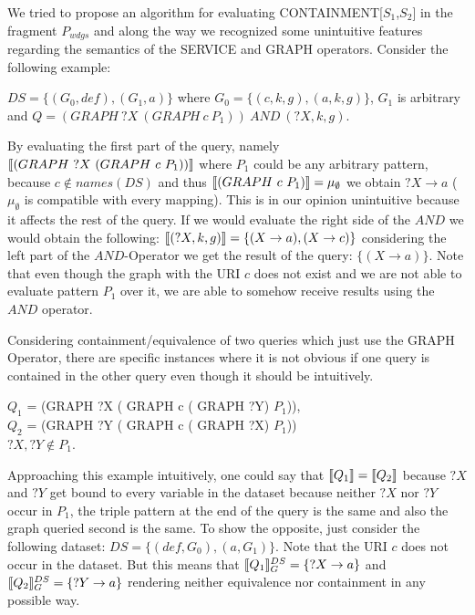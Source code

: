 			We tried to propose an algorithm for evaluating CONTAINMENT[$S_1$,$S_2$] in the
			fragment $P_{wdgs}$ and
			along the way we recognized some unintuitive features regarding the semantics of the
			SERVICE and GRAPH operators. Consider the following example:

			\begin{example}
				$DS=\{(G_0,def), (G_1,a) \}$ where $G_0 = \{
				(c,k,g), (a,k,g) \}$, $G_1$ is arbitrary and  $Q = (GRAPH \ ?X  \ (GRAPH  \ c \  P_1)) \ AND \ (?X,k,g)$.
			\end{example}

			By evaluating the first part of the query, namely $\llbracket (GRAPH \ ?X  \ (GRAPH  \
			c \  P_1)) \rrbracket$ where $P_1$ could be any arbitrary pattern, because $c \notin
			names(DS)$ and thus $\llbracket (GRAPH \ c  \ P_1) \rrbracket = \mu_\emptyset$  we obtain $?X
			\rightarrow a$ ($\mu_\emptyset$ is compatible with every mapping). This is in
			our opinion unintuitive because it affects the rest of the query.
			If we would evaluate the right side of the $AND$ we would obtain the following: $\llbracket(?X,k,g)\rrbracket = \{ (X \rightarrow a) , (X \rightarrow c) \}$ considering the
			left part of the $AND$-Operator we get the result of the query: $\{ (X \rightarrow a )
			\}$. Note that even though the graph with the URI $c$ does not exist and we are not able
			to evaluate pattern $P_1$ over it, we are able to somehow receive results using
			the $AND$ operator.
			\bigskip

			\noindent Considering containment/equivalence of two queries which just use the GRAPH
			Operator, there are specific instances where it is not obvious if one query is contained in the other query even though it should be intuitively.

			\begin{example}
				$Q_1$ = (GRAPH ?X ( GRAPH c ( GRAPH ?Y) $P_1$)),\\ 
				$Q_2$ = (GRAPH ?Y ( GRAPH c ( GRAPH ?X) $ P_1$))\\
				$?X,?Y \notin P_1$.
			\end{example}

			Approaching this example intuitively, one could say that $\llbracket Q_1 \rrbracket = \llbracket Q_2
			\rrbracket$ because $?X$ and $?Y$ get bound to every variable in the dataset because neither
			$?X$ nor $?Y$ occur in $P_1$, the triple pattern at the end
			of the query is the same and also the graph queried second is the same. 
			To show the opposite, just  consider the following dataset:
			$DS=\{(def,G_0), (a,G_1)\}$. Note that the URI $c$ does not occur in the dataset.
			But this means that $\llbracket Q_1 \rrbracket^{DS}_G = \{?X \rightarrow a\}$ and  $\llbracket Q_2
			\rrbracket^{DS}_G = \{?Y \rightarrow a\}$ rendering neither equivalence nor containment
			in any possible way.

